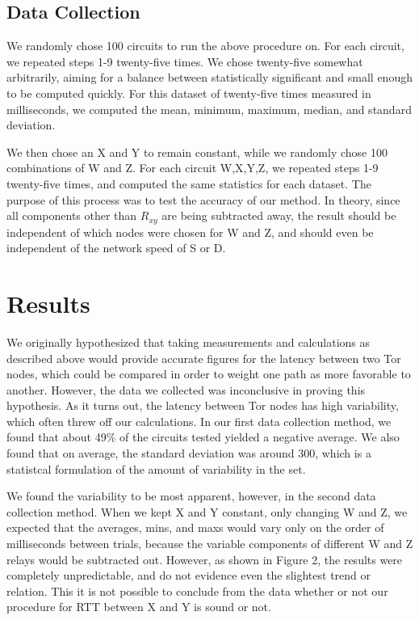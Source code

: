 \documentclass[twocolumn,11pt]{article}
\begin{document}
\subsection{Data Collection}
We randomly chose 100 circuits to run the above procedure on.
For each circuit, we repeated steps 1-9 twenty-five times. We chose twenty-five somewhat arbitrarily, aiming for a balance between statistically significant and small enough to be computed quickly. For this dataset of twenty-five times measured in milliseconds, we computed the mean, minimum, maximum, median, and standard deviation. 

We then chose an X and Y to remain constant, while we randomly chose 100 combinations of W and Z. For each circuit W,X,Y,Z, we repeated steps 1-9 twenty-five times, and computed the same statistics for each dataset. The purpose of this process was to test the accuracy of our method. In theory, since all components other than $R_{xy}$ are being subtracted away, the result should be independent of which nodes were chosen for W and Z, and should even be independent of the network speed of S or D. 

\section{Results}

We originally hypothesized that taking measurements and calculations as described above would provide accurate figures for the latency between two Tor nodes, which could be compared in order to weight one path as more favorable to another. However, the data we collected was inconclusive in proving this hypothesis. As it turns out, the latency between Tor nodes has high variability, which often threw off our calculations. In our first data collection method, we found that about 49\% of the circuits tested yielded a negative average. We also found that on average, the standard deviation was around 300, which is a statistcal formulation of the amount of variability in the set.

We found the variability to be most apparent, however, in the second data collection method. When we kept X and Y constant, only changing W and Z, we expected that the averages, mins, and maxs would vary only on the order of milliseconds between trials, because the variable components of different W and Z relays would be subtracted out. However, as shown in Figure 2, the results were completely unpredictable, and do not evidence even the slightest trend or relation. This it is not possible to conclude from the data whether or not our procedure for RTT between X and Y is sound or not. 
\end{document}
